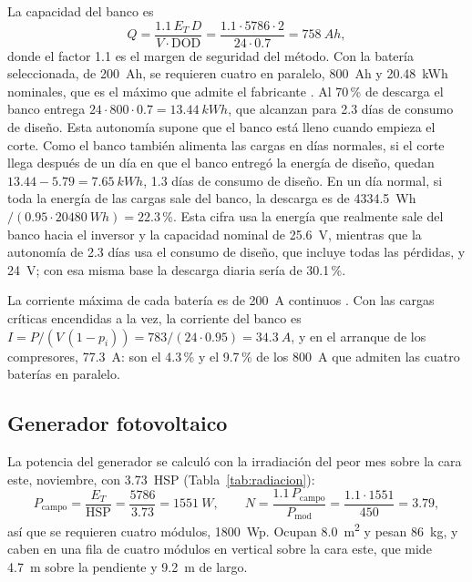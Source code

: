 La capacidad del banco es
\begin{equation}
Q = \frac{1.1\,E_T\,D}{V\cdot\mathrm{DOD}} = \frac{1.1\cdot5786\cdot2}{24\cdot0.7} = \SI{758}{Ah},
\end{equation}
donde el factor 1.1 es el margen de seguridad del método. Con la batería seleccionada, de \SI{200}{Ah}, se requieren cuatro en paralelo, \SI{800}{Ah} y \SI{20.48}{kWh} nominales, que es el máximo que admite el fabricante \cite{pq_manual}. Al 70\,\% de descarga el banco entrega $24\cdot800\cdot0.7=\SI{13.44}{kWh}$, que alcanzan para 2.3 días de consumo de diseño. Esta autonomía supone que el banco está lleno cuando empieza el corte. Como el banco también alimenta las cargas en días normales, si el corte llega después de un día en que el banco entregó la energía de diseño, quedan $13.44-5.79=\SI{7.65}{kWh}$, 1.3 días de consumo de diseño. En un día normal, si toda la energía de las cargas sale del banco, la descarga es de \SI{4334.5}{Wh}$/(0.95\cdot\SI{20480}{Wh})=22.3$\,\%. Esta cifra usa la energía que realmente sale del banco hacia el inversor y la capacidad nominal de \SI{25.6}{V}, mientras que la autonomía de 2.3 días usa el consumo de diseño, que incluye todas las pérdidas, y \SI{24}{V}; con esa misma base la descarga diaria sería de 30.1\,\%.

La corriente máxima de cada batería es de \SI{200}{A} continuos \cite{pq_manual}. Con las cargas críticas encendidas a la vez, la corriente del banco es $I=P/(V\,(1-p_i))=783/(24\cdot0.95)=\SI{34.3}{A}$, y en el arranque de los compresores, \SI{77.3}{A}: son el 4.3\,\% y el 9.7\,\% de los \SI{800}{A} que admiten las cuatro baterías en paralelo.

\subsection{Generador fotovoltaico}

La potencia del generador se calculó con la irradiación del peor mes sobre la cara este, noviembre, con \SI{3.73}{HSP} (Tabla~\ref{tab:radiacion}):
\begin{equation}
P_{\mathrm{campo}} = \frac{E_T}{\mathrm{HSP}} = \frac{5786}{3.73} = \SI{1551}{W}, \qquad N = \frac{1.1\,P_{\mathrm{campo}}}{P_{\mathrm{mod}}} = \frac{1.1\cdot1551}{450} = 3.79,
\end{equation}
así que se requieren cuatro módulos, \SI{1800}{Wp}. Ocupan \SI{8.0}{m^2} y pesan \SI{86}{kg}, y caben en una fila de cuatro módulos en vertical sobre la cara este, que mide \SI{4.7}{m} sobre la pendiente y \SI{9.2}{m} de largo.


